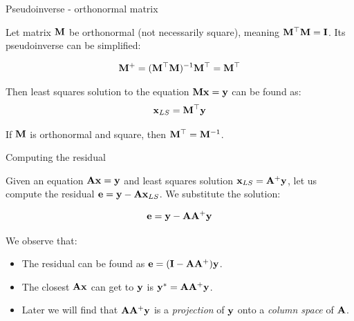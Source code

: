 \documentclass{beamer}
\begin{document}
\begin{frame}{Pseudoinverse - orthonormal matrix}
	\begin{flushleft}
		
		Let matrix $\mathbf{M}$ be orthonormal (not necessarily square), meaning $\mathbf{M}^\top \mathbf{M} = \mathbf{I}$. Its  pseudoinverse can be simplified:
		
		\begin{align}
			\mathbf{M}^+ = (\mathbf{M}^\top\mathbf{M})^{-1} \mathbf{M}^\top = \mathbf{M}^\top
		\end{align}
	
		\bigskip
	
		Then least squares solution to the equation $\mathbf{M} \mathbf{x} = \mathbf{y}$ can be found as:
		\begin{align}
			\mathbf{x}_{LS} = \mathbf{M}^\top \mathbf{y}
		\end{align}
	
		If $\mathbf{M}$ is orthonormal and square, then $\mathbf{M}^\top = \mathbf{M}^{-1}$.
	
	
	\end{flushleft}
\end{frame}




\begin{frame}{Computing the residual}
	\begin{flushleft}
		
		Given an equation $\mathbf{A}\mathbf{x} = \mathbf{y}$ and least squares solution $\mathbf{x}_{LS} = \mathbf{A}^+\mathbf{y}$, let us compute the residual $\mathbf{e} = \mathbf{y} - \mathbf{A}\mathbf{x}_{LS}$. We substitute the solution:
		 
		\begin{equation}
			\mathbf{e} = \mathbf{y} - \mathbf{A}\mathbf{A}^+\mathbf{y}
		\end{equation}
		
		We observe that:
		
		\begin{itemize}
			\item The residual can be found as $\mathbf{e} = (\mathbf{I} - \mathbf{A}\mathbf{A}^+)\mathbf{y}$.
			
			\item The closest $\mathbf{A}\mathbf{x}$ can get to $\mathbf{y}$ is $\mathbf{y}^* = \mathbf{A}\mathbf{A}^+\mathbf{y}$.
			
			\item Later we will find that $\mathbf{A}\mathbf{A}^+\mathbf{y}$ is a \emph{projection} of $\mathbf{y}$ onto a \emph{column space} of $\mathbf{A}$.
		\end{itemize}
		
	\end{flushleft}
\end{frame}
\end{document}
